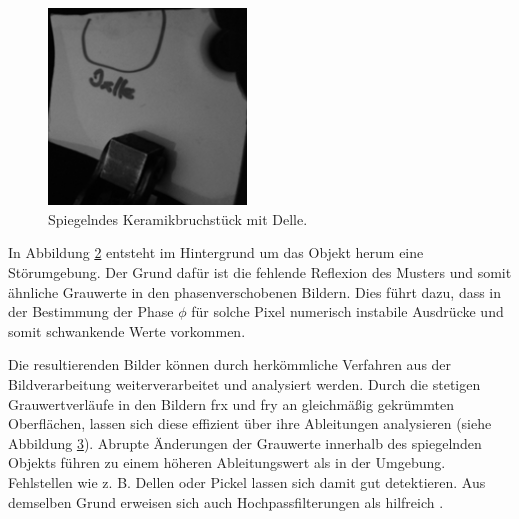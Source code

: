 {
	\begin{figure}[H]
		\centering
		\includegraphics[width = 0.47\textwidth]{04_deflektometrischeRegistrierung/auswertungDeflektometrischeRegistrierung/figures/delleBeleuchtet}
		\caption[Spiegelndes Keramikbruchstück mit Delle]{Spiegelndes Keramikbruchstück mit Delle.}
		\label{img:objektMitDelle}
	\end{figure}
}

{
	\begin{figure}[H]
		\centering
		
		\label{tikz:abbRegistrierungDelle}
	\end{figure}
}

\noindent
In Abbildung \ref{tikz:abbRegistrierungDelle} entsteht im Hintergrund um das Objekt herum eine Störumgebung.
Der Grund dafür ist die fehlende Reflexion des Musters und somit ähnliche Grauwerte in den phasenverschobenen Bildern.
Dies führt dazu, dass in der Bestimmung der Phase $\phi$ für solche Pixel numerisch instabile Ausdrücke und somit schwankende Werte vorkommen.

\p
Die resultierenden Bilder können durch herkömmliche Verfahren aus der Bildverarbeitung weiterverarbeitet und analysiert werden.
Durch die stetigen Grauwertverläufe in den Bildern \acrshort{frx} und \acrshort{fry} an gleichmäßig gekrümmten Oberflächen, lassen sich diese effizient über ihre Ableitungen analysieren (siehe Abbildung \ref{tikz:abbGradientenbildReg}).
Abrupte Änderungen der Grauwerte innerhalb des spiegelnden Objekts führen zu einem höheren Ableitungswert als in der Umgebung. Fehlstellen wie z. B. Dellen oder Pickel lassen sich damit gut detektieren.
Aus demselben Grund erweisen sich auch Hochpassfilterungen als hilfreich \cite{kit_werling}.

{
	\begin{figure}[H]
		\centering
		
		\label{tikz:abbGradientenbildReg}
	\end{figure}
}


